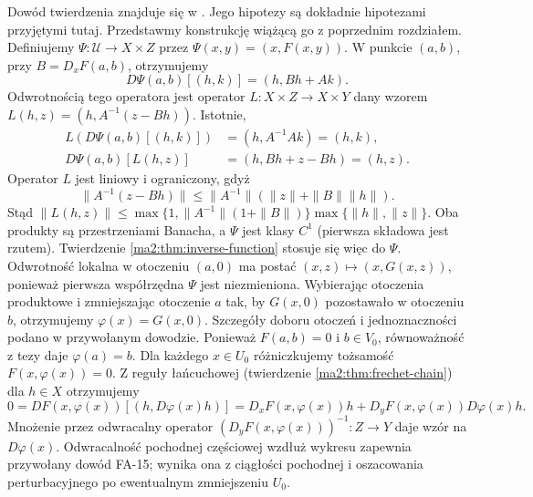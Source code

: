 Dowód twierdzenia znajduje się w
.
Jego hipotezy są dokładnie hipotezami przyjętymi tutaj.
Przedstawmy konstrukcję wiążącą go z poprzednim rozdziałem.
Definiujemy $\Psi:\mathcal U\to X\times Z$ przez
$\Psi(x,y)=(x,F(x,y))$. W punkcie $(a,b)$, przy
$B=D_xF(a,b)$, otrzymujemy
\[
 D\Psi(a,b)[(h,k)]=(h,Bh+Ak).
\]
Odwrotnością tego operatora jest
operator $L:X\times Z\to X\times Y$ dany wzorem
$L(h,z)=(h,A^{-1}(z-Bh))$. Istotnie,
\[
 \begin{aligned}
 L(D\Psi(a,b)[(h,k)])&=(h,A^{-1}Ak)=(h,k),\\
 D\Psi(a,b)[L(h,z)]&=(h,Bh+z-Bh)=(h,z).
 \end{aligned}
\]
Operator $L$ jest liniowy i ograniczony, gdyż
\[
 \|A^{-1}(z-Bh)\|
 \le\|A^{-1}\|(\|z\|+\|B\|\|h\|).
\]
Stąd $\|L(h,z)\|\le
\max\{1,\|A^{-1}\|(1+\|B\|)\}\max\{\|h\|,\|z\|\}$.
Oba produkty są przestrzeniami Banacha, a $\Psi$
jest klasy $C^1$ (pierwsza składowa jest rzutem).
Twierdzenie \ref{ma2:thm:inverse-function} stosuje się
więc do $\Psi$. Odwrotność lokalna w otoczeniu $(a,0)$
ma postać $(x,z)\mapsto(x,G(x,z))$, ponieważ pierwsza
współrzędna $\Psi$ jest niezmieniona.
Wybierając otoczenia produktowe i zmniejszając otoczenie
$a$ tak, by $G(x,0)$ pozostawało w otoczeniu $b$,
otrzymujemy $\varphi(x)=G(x,0)$. Szczegóły doboru
otoczeń i jednoznaczności podano w przywołanym dowodzie.
Ponieważ $F(a,b)=0$ i $b\in V_0$, równoważność
z tezy daje $\varphi(a)=b$. Dla każdego $x\in U_0$
różniczkujemy tożsamość $F(x,\varphi(x))=0$.
Z reguły łańcuchowej (twierdzenie \ref{ma2:thm:frechet-chain})
dla $h\in X$ otrzymujemy
\[
 0=DF(x,\varphi(x))[(h,D\varphi(x)h)]
  =D_xF(x,\varphi(x))h+
    D_yF(x,\varphi(x))D\varphi(x)h.
\]
Mnożenie przez odwracalny operator
$(D_yF(x,\varphi(x)))^{-1}:Z\to Y$
daje wzór na $D\varphi(x)$.
Odwracalność pochodnej częściowej wzdłuż wykresu
zapewnia przywołany dowód FA-15; wynika ona
z ciągłości pochodnej i oszacowania perturbacyjnego
po ewentualnym zmniejszeniu $U_0$.

